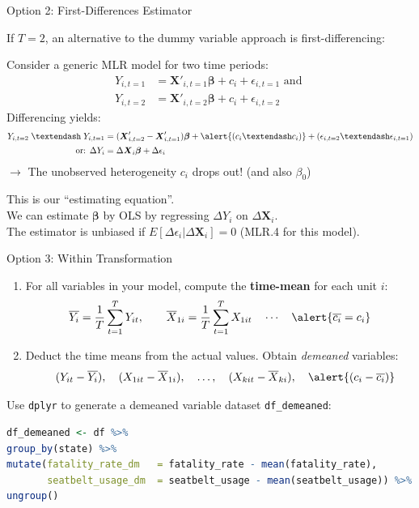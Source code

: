 \documentclass[11pt, aspectratio = 169]{beamer}
\begin{document}
\begin{frame}{Option 2: First-Differences Estimator}

If $T = 2$, an alternative to the dummy variable approach is first-differencing:

Consider a generic MLR model for two time periods:
\begin{align*}
    Y_{i, t=1}& = \boldsymbol{X}'_{i, t=1}\boldsymbol{\beta} + c_i + \epsilon_{i, t=1}  \text{ and  } \\
Y_{i, t=2} &= \boldsymbol{X}'_{i, t=2}\boldsymbol{\beta} + c_i + \epsilon_{i, t=2}   
\end{align*}
\pause
Differencing yields: 
\begin{align*}
Y_{i, t=2} \;– \; Y_{i, t=1} &= (\boldsymbol{X}'_{i, t=2} - \boldsymbol{X}'_{i, t=1}) \boldsymbol{\beta} + \alert{(c_i – c_i)} + (\epsilon_{i, t=2} – \epsilon_{i, t=1}) \\
\text{ or: } \Delta Y_i &= \Delta \boldsymbol{X}_{i} \boldsymbol{\beta} + \Delta\epsilon_i
\end{align*}
\pause
$\rightarrow$ The unobserved heterogeneity \alert{$c_i$} drops out! (and also $\beta_0$)

\pause 
This is our “estimating equation”. \\
We can estimate $\boldsymbol{\beta}$ by OLS by regressing $\Delta Y_i$ on $\Delta \boldsymbol{X}_i$. \\
The estimator is unbiased if $E[\Delta\epsilon_i|\Delta \boldsymbol{X}_{i}] = 0$ (MLR.4 for this model).
\end{frame}


\begin{frame}[fragile]{Option 3: Within Transformation}
\begin{enumerate}
    \item For all variables in your model, compute the \textbf{time-mean} for each unit $i$:
    \[
    \overline{Y_{i}} = \frac{1}{T} \sum_{t=1}^T Y_{it}, 
    \qquad 
    \overline{X}_{1i} = \frac{1}{T} \sum_{t=1}^T X_{1it} \quad \cdots \quad \alert{\overline{c_{i}} = c_i}
    \]
    \pause
    \item Deduct the time means from the actual values.  
    Obtain \textit{demeaned} variables:  
    \[\quad (Y_{it}-\overline{Y_{i}}),\quad (X_{1it}-\overline{X}_{1i}),\quad \ldots,\quad (X_{kit}-\overline{X}_{ki}), \quad \alert{(c_i - \overline{c_{i}})} \]
\end{enumerate}
\pause
Use \texttt{dplyr} to generate a demeaned variable dataset \texttt{df\_demeaned}:
\begin{lstlisting}[language=R]
df_demeaned <- df %>%
group_by(state) %>%
mutate(fatality_rate_dm   = fatality_rate - mean(fatality_rate),
       seatbelt_usage_dm  = seatbelt_usage - mean(seatbelt_usage)) %>%
ungroup()
\end{lstlisting}
\end{frame}
\end{document}
